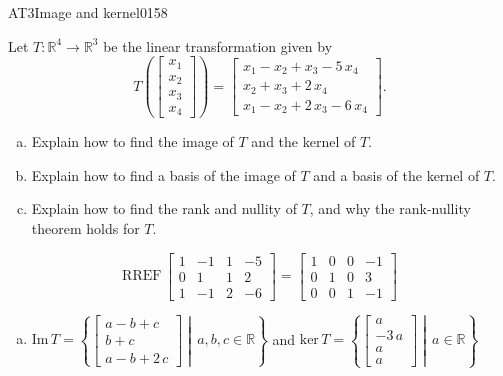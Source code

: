 \begin{exercise}{AT3}{Image and kernel}{0158} 
\begin{exerciseStatement} 

 Let \(T:\mathbb{R}^4 \to \mathbb{R}^3\) be the linear transformation given by \[T\left( \left[\begin{array}{c}
x_{1} \\
x_{2} \\
x_{3} \\
x_{4}
\end{array}\right] \right) = \left[\begin{array}{c}
x_{1} - x_{2} + x_{3} - 5 \, x_{4} \\
x_{2} + x_{3} + 2 \, x_{4} \\
x_{1} - x_{2} + 2 \, x_{3} - 6 \, x_{4}
\end{array}\right].\] 

 

\begin{enumerate}[(a)]
\item Explain how to find the image of \(T\) and the kernel of \(T\).
\item Explain how to find a basis of the image of \(T\) and a basis of the kernel of \(T\).
\item Explain how to find the rank and nullity of \(T\), and why the rank-nullity theorem holds for \(T\).
\end{enumerate}

     \end{exerciseStatement}
 \begin{exerciseAnswer} 

\[\mathrm{RREF}\,\left[\begin{array}{cccc}
1 & -1 & 1 & -5 \\
0 & 1 & 1 & 2 \\
1 & -1 & 2 & -6
\end{array}\right]=\left[\begin{array}{cccc}
1 & 0 & 0 & -1 \\
0 & 1 & 0 & 3 \\
0 & 0 & 1 & -1
\end{array}\right]\]

 

\begin{enumerate}[(a)]
\item  

 \(\mathrm{Im}\,T =  \left\{ \left[\begin{array}{c}
a - b + c \\
b + c \\
a - b + 2 \, c
\end{array}\right] \middle|\,a,b,c\in\mathbb{R}\right\}\) and \(\mathrm{ker}\,T = \left\{ \left[\begin{array}{c}
a \\
-3 \, a \\
a \\
a
\end{array}\right] \middle|\,a\in\mathbb{R}\right\}\) 


\end{enumerate}
\end{exerciseAnswer}
\end{exercise}
